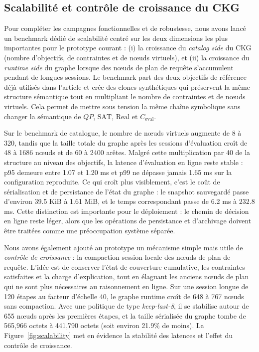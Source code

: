 \documentclass[journal]{IEEEtran}
\begin{document}
\subsection{Scalabilité et contrôle de croissance du CKG}

Pour compléter les campagnes fonctionnelles et de robustesse, nous avons lancé un benchmark dédié de scalabilité centré sur les deux dimensions les plus importantes pour le prototype courant : (i) la croissance du \emph{catalog side} du CKG (nombre d'objectifs, de contraintes et de nœuds virtuels), et (ii) la croissance du \emph{runtime side} du graphe lorsque des nœuds de plan de requête s'accumulent pendant de longues sessions. Le benchmark part des deux objectifs de référence déjà utilisés dans l'article et crée des clones synthétiques qui préservent la même structure sémantique tout en multipliant le nombre de contraintes et de nœuds virtuels. Cela permet de mettre sous tension la même chaîne symbolique sans changer la sémantique de $QP$, $\mathrm{SAT}$, $\mathrm{Real}$ et $C_{\mathrm{eval}}$.

Sur le benchmark de catalogue, le nombre de nœuds virtuels augmente de 8 à 320, tandis que la taille totale du graphe après les sessions d'évaluation croît de 48 à 1686 nœuds et de 60 à 2400 arêtes. Malgré cette multiplication par 40 de la structure au niveau des objectifs, la latence d'évaluation en ligne reste stable : p95 demeure entre 1.07 et 1.20 ms et p99 ne dépasse jamais 1.65 ms sur la configuration reproduite. Ce qui croît plus visiblement, c'est le coût de sérialisation et de persistance de l'état du graphe : le snapshot sauvegardé passe d'environ 39.5 KiB à 1.61 MiB, et le temps correspondant passe de 6.2 ms à 232.8 ms. Cette distinction est importante pour le déploiement : le chemin de décision en ligne reste léger, alors que les opérations de persistance et d'archivage doivent être traitées comme une préoccupation système séparée.

Nous avons également ajouté au prototype un mécanisme simple mais utile de \emph{contrôle de croissance} : la compaction session-locale des nœuds de plan de requête. L'idée est de conserver l'état de couverture cumulative, les contraintes satisfaites et la charge d'explication, tout en élaguant les anciens nœuds de plan qui ne sont plus nécessaires au raisonnement en ligne. Sur une session longue de 120 étapes au facteur d'échelle 40, le graphe runtime croît de 648 à 767 nœuds sans compaction. Avec une politique de type \emph{keep-last-8}, il se stabilise autour de 655 nœuds après les premières étapes, et la taille sérialisée du graphe tombe de 565{,}966 octets à 441{,}790 octets (soit environ 21.9\% de moins). La Figure~\ref{fig:scalability} met en évidence la stabilité des latences et l'effet du contrôle de croissance.
\end{document}
